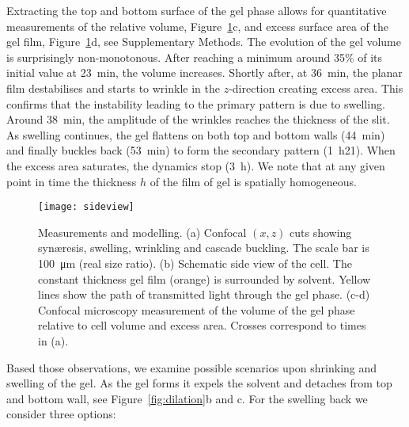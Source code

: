\documentclass[twocolumn,superscriptaddress,showpacs,preprintnumbers,
amsmath,amssymb,prl]{revtex4-1}
\begin{document}
Extracting the top and bottom surface of the gel phase allows for quantitative measurements of the relative volume, Figure~\ref{fig:sideview}c, and excess surface area of the gel film, Figure~\ref{fig:sideview}d, see Supplementary Methods. The evolution of the gel volume is surprisingly non-monotonous. After reaching a minimum around 35\% of its initial value at \SI{23}{\minute}, the volume increases. Shortly after, at \SI{36}{\minute}, the planar film destabilises and starts to wrinkle in the $z$-direction creating excess area. This confirms that the instability leading to the primary pattern is due to swelling. Around \SI{38}{\minute}, the amplitude of the wrinkles reaches the thickness of the slit. As swelling continues, the gel flattens on both top and bottom walls (\SI{44}{\minute}) and finally buckles back (\SI{53}{\minute}) to form the secondary pattern (\SI{1}{\hour}21). When the excess area saturates, the dynamics stop (\SI{3}{\hour}). We note that at any given point in time the thickness $h$ of the film of gel is spatially homogeneous. %



\begin{figure}
	\texttt{[image: sideview]}
	\caption{Measurements and modelling. (a) Confocal $(x,z)$ cuts showing syn\ae{}resis, swelling, wrinkling and cascade buckling. The scale bar is \SI{100}{\micro\metre} (real size ratio). (b) Schematic side view of the cell. The constant thickness gel film (orange) is surrounded by solvent. Yellow lines show the path of transmitted light through the gel phase. (c-d) Confocal microscopy measurement of the volume of the gel phase relative to cell volume and excess area. Crosses correspond to times in (a).}
	\label{fig:sideview}
\end{figure}

Based those observations, we examine possible scenarios upon shrinking and swelling of the gel. As the gel forms it expels the solvent and detaches from top and bottom wall, see Figure~\ref{fig:dilation}b and c. For the swelling back we consider three options: 
\end{document}
